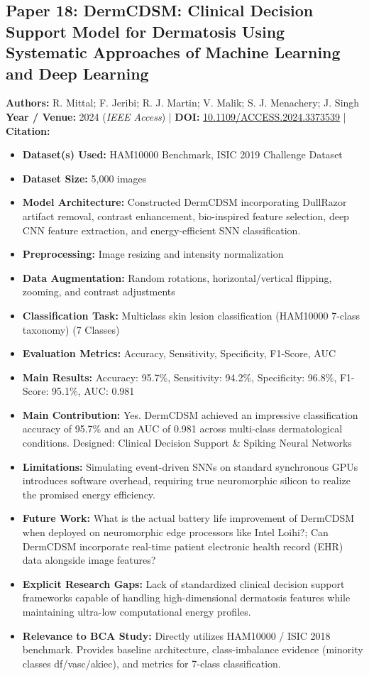 \documentclass[11pt,a4paper]{article}
\begin{document}
\subsection{Paper 18: DermCDSM: Clinical Decision Support Model for Dermatosis Using Systematic Approaches of Machine Learning and Deep Learning}
\textbf{Authors:} R. Mittal; F. Jeribi; R. J. Martin; V. Malik; S. J. Menachery; J. Singh \\
\textbf{Year / Venue:} 2024 (\textit{IEEE Access}) | \textbf{DOI:} \href{https://doi.org/10.1109/ACCESS.2024.3373539}{10.1109/ACCESS.2024.3373539} | \textbf{Citation:} \cite{10459206}

\begin{itemize}\small
\item \textbf{Dataset(s) Used:} HAM10000 Benchmark, ISIC 2019 Challenge Dataset
\item \textbf{Dataset Size:} 5,000 images
\item \textbf{Model Architecture:} Constructed DermCDSM incorporating DullRazor artifact removal, contrast enhancement, bio-inspired feature selection, deep CNN feature extraction, and energy-efficient SNN classification.
\item \textbf{Preprocessing:} Image resizing and intensity normalization
\item \textbf{Data Augmentation:} Random rotations, horizontal/vertical flipping, zooming, and contrast adjustments
\item \textbf{Classification Task:} Multiclass skin lesion classification (HAM10000 7-class taxonomy) (7 Classes)
\item \textbf{Evaluation Metrics:} Accuracy, Sensitivity, Specificity, F1-Score, AUC
\item \textbf{Main Results:} Accuracy: 95.7\%, Sensitivity: 94.2\%, Specificity: 96.8\%, F1-Score: 95.1\%, AUC: 0.981
\item \textbf{Main Contribution:} Yes. DermCDSM achieved an impressive classification accuracy of 95.7\% and an AUC of 0.981 across multi-class dermatological conditions. Designed: Clinical Decision Support \& Spiking Neural Networks
\item \textbf{Limitations:} Simulating event-driven SNNs on standard synchronous GPUs introduces software overhead, requiring true neuromorphic silicon to realize the promised energy efficiency.
\item \textbf{Future Work:} What is the actual battery life improvement of DermCDSM when deployed on neuromorphic edge processors like Intel Loihi?; Can DermCDSM incorporate real-time patient electronic health record (EHR) data alongside image features?
\item \textbf{Explicit Research Gaps:} Lack of standardized clinical decision support frameworks capable of handling high-dimensional dermatosis features while maintaining ultra-low computational energy profiles.
\item \textbf{Relevance to BCA Study:} Directly utilizes HAM10000 / ISIC 2018 benchmark. Provides baseline architecture, class-imbalance evidence (minority classes df/vasc/akiec), and metrics for 7-class classification.
\end{itemize}
\end{document}
